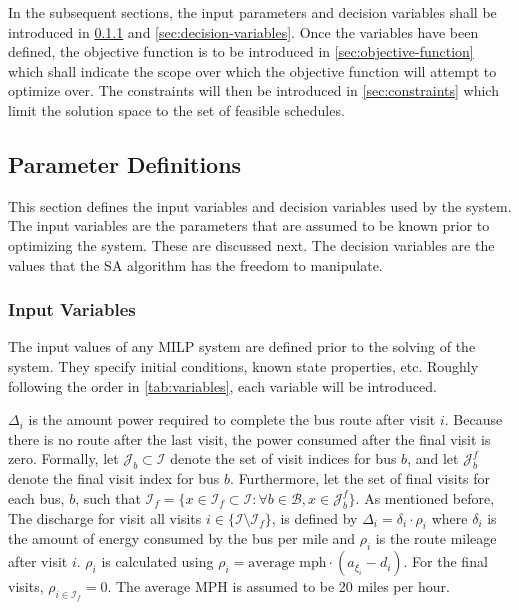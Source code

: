 \documentclass[11pt,a4paper,final]{article}
\newcommand{\Iset}{\mathcal{I}}             %
\newcommand{\Isetfinal}{\mathcal{I}_f}      %
\newcommand{\Bset}{\mathcal{B}}             %
\newcommand{\Jset}{\mathcal{J}}             %
\begin{document}
In the subsequent sections, the input parameters and decision variables shall be introduced in \ref{sec:input-variables} and
\ref{sec:decision-variables}. Once the variables have been defined, the objective function is to be introduced in
\ref{sec:objective-function} which shall indicate the scope over which the objective function will attempt to optimize over.
The constraints will then be introduced in \ref{sec:constraints} which limit the solution space to the set of feasible schedules.

\subsection{Parameter Definitions}
\label{sec:parameter-definitions}
This section defines the input variables and decision variables used by the system. The input variables are the
parameters that are assumed to be known prior to optimizing the system. These are discussed next. The decision variables
are the values that the SA algorithm has the freedom to manipulate.

\subsubsection{Input Variables}
\label{sec:input-variables}
The input values of any MILP system are defined prior to the solving of the system. They specify initial conditions,
known state properties, etc. Roughly following the order in \ref{tab:variables}, each variable will be introduced.

\(\Delta_i\) is the amount power required to complete the bus route after visit \(i\). Because there is no route after the last
visit, the power consumed after the final visit is zero. Formally, let \(\Jset_b \subset \Iset\) denote the set of visit indices
for bus \(b\), and let \(\Jset_b^f\) denote the final visit index for bus \(b\). Furthermore, let the set of final visits for
each bus, \(b\), such that \(\Isetfinal = \{ x \in \Isetfinal \subset \Iset : \forall b \in \Bset, x \in \Jset_b^f \}\). As mentioned before,
The discharge for visit all visits \(i \in \{\Iset \setminus \Isetfinal\}\), is defined by \(\Delta_i = \delta_i \cdot \rho_i\) where \(\delta_i\) is the
amount of energy consumed by the bus per mile and \(\rho_i\) is the route mileage after visit \(i\). \(\rho_i\) is calculated using
\(\rho_i = \text{average mph} \cdot (a_{\xi_i} - d_i)\). For the final visits, \(\rho_{i \in \Isetfinal} = 0\). The average MPH is assumed
to be 20 miles per hour.
\end{document}

